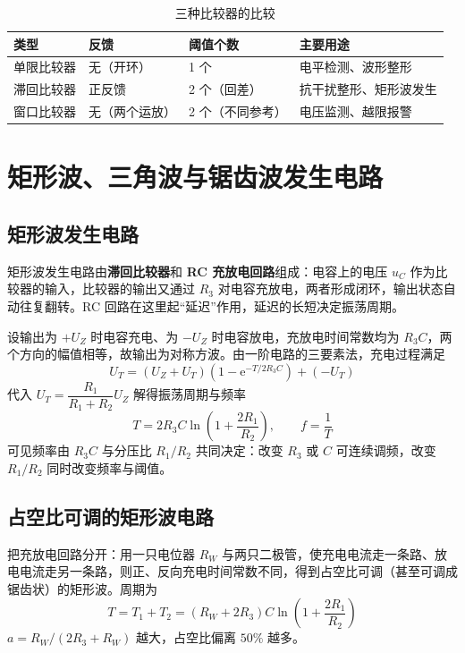 \begin{table}[htbp]
\centering
\caption{三种比较器的比较}
\begin{tabular}{@{}llll@{}}
\hline
类型 & 反馈 & 阈值个数 & 主要用途 \\
\hline
单限比较器 & 无（开环） & 1 个 & 电平检测、波形整形 \\
滞回比较器 & 正反馈 & 2 个（回差） & 抗干扰整形、矩形波发生 \\
窗口比较器 & 无（两个运放） & 2 个（不同参考） & 电压监测、越限报警 \\
\hline
\end{tabular}
\end{table}

\section{矩形波、三角波与锯齿波发生电路}
\subsection{矩形波发生电路}
矩形波发生电路由\textbf{滞回比较器}和 \textbf{RC 充放电回路}组成：电容上的电压 $u_C$ 作为比较器的输入，比较器的输出又通过 $R_3$ 对电容充放电，两者形成闭环，输出状态自动往复翻转。RC 回路在这里起“延迟”作用，延迟的长短决定振荡周期。

设输出为 $+U_Z$ 时电容充电、为 $-U_Z$ 时电容放电，充放电时间常数均为 $R_3C$，两个方向的幅值相等，故输出为对称方波。由一阶电路的三要素法，充电过程满足
\begin{equation}
U_T=(U_Z+U_T)\left(1-\mathrm{e}^{-T/2R_3C}\right)+(-U_T)
\end{equation}
代入 $U_T=\dfrac{R_1}{R_1+R_2}U_Z$ 解得振荡周期与频率
\begin{equation}
T=2R_3C\ln\left(1+\frac{2R_1}{R_2}\right),\qquad f=\frac{1}{T}
\end{equation}
可见频率由 $R_3C$ 与分压比 $R_1/R_2$ 共同决定：改变 $R_3$ 或 $C$ 可连续调频，改变 $R_1/R_2$ 同时改变频率与阈值。

\subsection{占空比可调的矩形波电路}
把充放电回路分开：用一只电位器 $R_W$ 与两只二极管，使充电电流走一条路、放电电流走另一条路，则正、反向充电时间常数不同，得到占空比可调（甚至可调成锯齿状）的矩形波。周期为
\begin{equation}
T=T_1+T_2=(R_W+2R_3)C\ln\left(1+\frac{2R_1}{R_2}\right)
\end{equation}
$a=R_W/(2R_3+R_W)$ 越大，占空比偏离 $50\%$ 越多。

